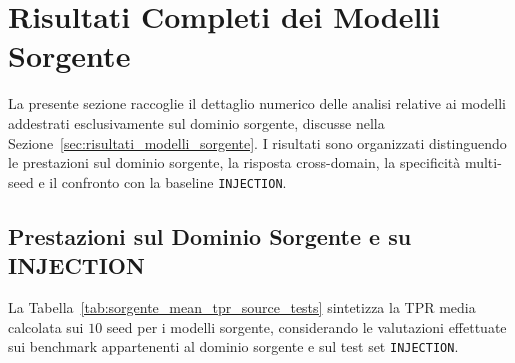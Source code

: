 
\section{Risultati Completi dei Modelli Sorgente}
\label{app:modelli_sorgente}

La presente sezione raccoglie il dettaglio numerico delle analisi relative ai modelli addestrati esclusivamente sul dominio sorgente, discusse nella Sezione~\ref{sec:risultati_modelli_sorgente}. 
I risultati sono organizzati distinguendo le prestazioni sul dominio sorgente, la risposta cross-domain, la specificità multi-seed e il confronto con la baseline \texttt{INJECTION}.


\subsection{Prestazioni sul Dominio Sorgente e su INJECTION}

La Tabella~\ref{tab:sorgente_mean_tpr_source_tests} sintetizza la TPR media calcolata sui $10$ seed per i modelli sorgente, considerando le valutazioni effettuate sui benchmark appartenenti al dominio sorgente e sul test set \texttt{INJECTION}.

